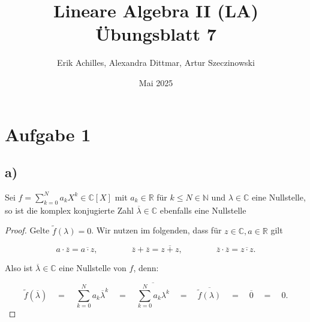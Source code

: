 \documentclass{article}
\title{Lineare Algebra II (LA) Übungsblatt 7}
\author{Erik Achilles, Alexandra Dittmar, Artur Szeczinowski}
\date{Mai 2025}
\newcommand{\NN}{\mathbb{N}}
\newcommand{\RR}{\mathbb{R}}
\newcommand{\CC}{\mathbb{C}}
\newcommand{\eq}{\mathbb{\quad = \quad}}
\begin{document}

\section*{Aufgabe 1}
\subsection*{a)}

Sei $f = \sum_{k=0}^{N}a_kX^k\in \CC[X]$ mit
$a_k \in \RR$ für $k \leq N \in \NN$ und
$\lambda \in \CC$ eine Nullstelle, so ist die
komplex konjugierte Zahl $\overline{\lambda} \in \CC$
ebenfalls eine Nullstelle

\begin{proof}
  Gelte $\tilde{f}(\lambda) = 0$.
  Wir nutzen im folgenden, dass für $z\in\CC,a\in\RR$ gilt

  \[
  a \cdot \overline{z} = \overline{a \cdot z},
  \qquad\qquad
  \overline{z} + \overline{z} = \overline{z + z},
  \qquad\qquad
  \overline{z} \cdot \overline{z} = \overline{z \cdot z}.
  \]

  Also ist $\overline{\lambda} \in \CC$ eine Nullstelle von $f$,
  denn:

  \[
  \tilde{f}(\overline{\lambda})
  \eq
  \sum_{k=0}^{N}a_k \overline{\lambda}^k
  \eq
  \overline{\sum_{k=0}^{N}a_k \lambda^k}
  \eq
  \overline{\tilde{f}(\lambda)}
  \eq
  \overline{0}
  \eq
  0.
  \]
\end{proof}
\end{document}
